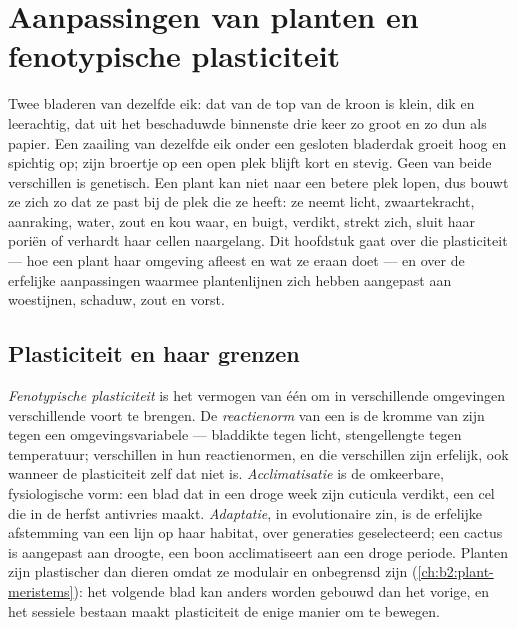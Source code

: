 \chapter{Aanpassingen van planten en fenotypische plasticiteit}\label{ch:b2:plant-plasticity}

Twee bladeren van dezelfde eik: dat van de top van de kroon is klein, dik
en leerachtig, dat uit het beschaduwde binnenste drie keer zo groot en zo
dun als papier. Een zaailing van dezelfde eik onder een gesloten bladerdak
groeit hoog en spichtig op; zijn broertje op een open plek blijft kort en
stevig. Geen van beide verschillen is genetisch. Een plant kan niet naar
een betere plek lopen, dus bouwt ze zich zo dat ze past bij de plek die ze
heeft: ze neemt licht, zwaartekracht, aanraking, water, zout en kou waar, en
buigt, verdikt, strekt zich, sluit haar poriën of verhardt haar cellen
naargelang. Dit hoofdstuk gaat over die plasticiteit --- hoe een plant haar
omgeving afleest en wat ze eraan doet --- en over de erfelijke aanpassingen
waarmee plantenlijnen zich hebben aangepast aan woestijnen, schaduw, zout en
vorst.

\section{Plasticiteit en haar grenzen}

\begin{definition}\label{def:b2:plant-plasticity:plasticity}
\emph{Fenotypische plasticiteit} is het vermogen van één  om in
verschillende omgevingen verschillende  voort te brengen. De
\emph{reactienorm} van een  is de kromme van zijn  tegen een
omgevingsvariabele --- bladdikte tegen licht, stengellengte tegen
temperatuur;  verschillen in hun reactienormen, en die verschillen
zijn erfelijk, ook wanneer de plasticiteit zelf dat niet is.
\emph{Acclimatisatie} is de omkeerbare, fysiologische vorm: een blad dat in
een droge week zijn cuticula verdikt, een cel die in de herfst
antivries maakt. \emph{Adaptatie}, in evolutionaire zin, is de erfelijke
afstemming van een lijn op haar habitat, over generaties geselecteerd; een
cactus is aangepast aan droogte, een boon acclimatiseert aan een droge
periode. Planten zijn plastischer dan dieren omdat ze modulair en
onbegrensd zijn (\cref{ch:b2:plant-meristems}): het volgende blad kan anders
worden gebouwd dan het vorige, en het sessiele bestaan maakt plasticiteit de
enige manier om te bewegen.
\end{definition}

